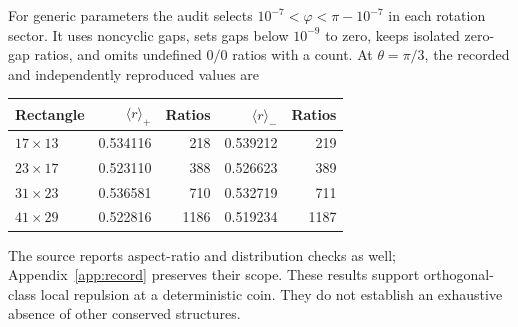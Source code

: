 \documentclass[11pt,a4paper,oneside]{report}
\numberwithin{equation}{chapter}
\begin{document}
For generic parameters the audit selects
\(10^{-7}<\varphi<\pi-10^{-7}\) in each rotation sector. It uses
noncyclic gaps, sets gaps below \(10^{-9}\) to zero, keeps isolated
zero-gap ratios, and omits undefined \(0/0\) ratios with a count.
At \(\theta=\pi/3\), the recorded and independently reproduced
values are
\begin{center}
\begin{tabular}{@{}lrrrr@{}}
\toprule
Rectangle&\(\langle r\rangle_+\)&Ratios&\(\langle r\rangle_-\)&Ratios\\
\midrule
\(17\times13\)&0.534116&218&0.539212&219\\
\(23\times17\)&0.523110&388&0.526623&389\\
\(31\times23\)&0.536581&710&0.532719&711\\
\(41\times29\)&0.522816&1186&0.519234&1187\\
\bottomrule
\end{tabular}
\end{center}
The source reports aspect-ratio and distribution checks as well;
Appendix~\ref{app:record} preserves their scope. These results support
orthogonal-class local repulsion at a deterministic coin. They do not
establish an exhaustive absence of other conserved structures.
\end{document}

